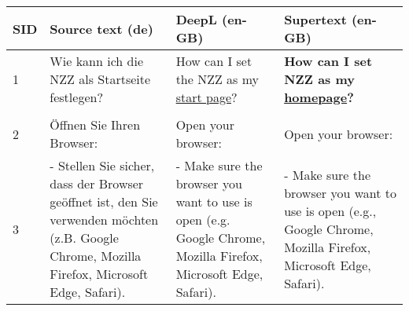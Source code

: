 {\renewcommand{\arraystretch}{1.3}
\begin{tabularx}{\textwidth}{l>{\raggedright\arraybackslash}X>{\raggedright\arraybackslash}X>{\raggedright\arraybackslash}X}
\toprule
SID   & Source text (de)                                                                                                                               & DeepL (en-GB)                                                                                                                              & Supertext (en-GB)                                                                                                                              \\ \midrule
1  & Wie kann ich die NZZ als Startseite festlegen?                                                                                                    & How can I set the NZZ as my \underline{start page}?                                                                                                    & \textbf{How can I set NZZ as my \underline{homepage}?}                                                                                                     \\
   &                                                                                                                                                   &                                                                                                                                            &                                                                                                                                                \\
2  & Öffnen Sie Ihren Browser:                                                                                                                         & Open your browser:                                                                                                                         & Open your browser:                                                                                                                             \\
3  & - Stellen Sie sicher, dass der Browser geöffnet ist, den Sie verwenden möchten (z.B. Google Chrome, Mozilla Firefox, Microsoft Edge, Safari).     & - Make sure the browser you want to use is open (e.g. Google Chrome, Mozilla Firefox, Microsoft Edge, Safari).                             & - Make sure the browser you want to use is open (e.g., Google Chrome, Mozilla Firefox, Microsoft Edge, Safari).                                \\

\end{tabularx}}
